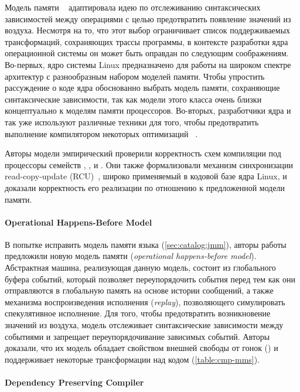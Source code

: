 Модель памяти \LKMM~\cite{Alglave-al:ASPLOS18} 
адаптировала идею по отслеживанию синтаксических зависимостей
между операциями с целью предотвратить появление значений из воздуха. 
Несмотря на то, что этот выбор ограничивает список поддерживаемых 
трансформаций, сохраняющих трассы программы, 
в контексте разработки ядра операционной системы 
он может быть оправдан по следующим соображениям. 
Во-первых, ядро системы Linux предназначено для работы 
на широком спектре архитектур с разнообразным 
набором моделей памяти. Чтобы упростить рассуждение о коде ядра
обоснованно выбрать модель памяти, сохраняющие синтаксические зависимости, 
так как модели этого класса очень близки концептуально к 
моделям памяти процессоров. 
Во-вторых, разработчики ядра и так уже используют 
различные техники для того, чтобы предотвратить
выполнение компилятором некоторых оптимизаций~%
\cite{Alglave-al:ASPLOS18, LK-MemBarriers, LK-RCU-Deref}.

Авторы модели эмпирический проверили корректность схем 
компиляции под процессоры семейств \Intel, ,  и \POWER. 
Они также формализовали механизм синхронизации 
read-copy-update (RCU)~\cite{McKenney-RCU2007}, 
широко применяемый в кодовой базе ядра Linux, 
и доказали корректность его реализации 
по отношению к предложенной модели памяти. 

\paragraph{Operational Happens-Before Model}

В попытке исправить модель памяти языка \Java (\see \cref{sec:catalog:jmm}), 
авторы работы~\cite{Zhang-Feng:FCS16} предложили новую модель памяти \OHMM
(\emph{operational happens-before model}).
Абстрактная машина, реализующая данную модель, 
состоит из глобального буфера событий, 
который позволяет переупорядочить события перед тем 
как они отправляются в глобальную память на основе истории сообщений, 
а также механизма воспроизведения исполнения (\emph{replay}), 
позволяющего симулировать спекулятивное исполнение. 
Для того, чтобы предотвратить возникновение значений из воздуха, 
модель отслеживает синтаксические зависимости между 
событиями и запрещает переупорядочивание зависимых событий. 
Авторы доказали, что их модель обладает свойством внешней свободы от гонок (\eDRF)
и поддерживает некоторые трансформации над кодом 
(\see \cref{table:cmp-mms}).

\paragraph{Dependency Preserving Compiler}

